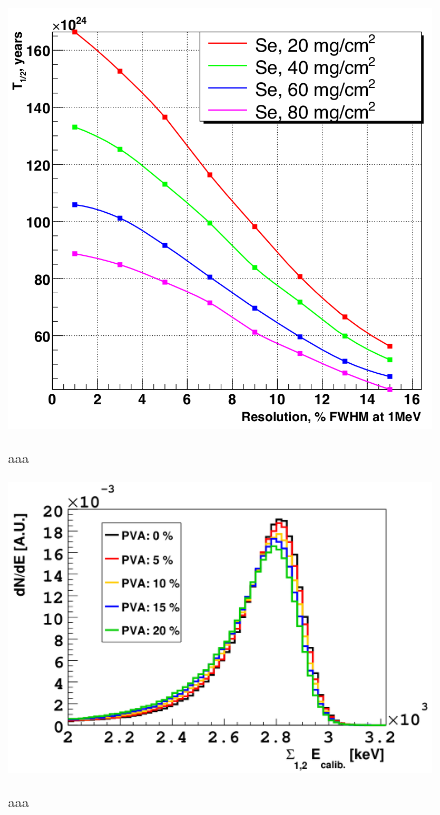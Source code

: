 \documentclass[main.tex]{subfiles}
\begin{document}
\begin{figure}[h!]
\centering
\includegraphics[scale=0.3]{pictures/Chap4/SensVsResolution.png}
\label{SensVsResolution.png}
\caption{aaa}
\end{figure}


\begin{figure}[h!]
\centering
\includegraphics[scale=0.3]{pictures/Chap4/SpectrumPVA.png}
\label{SpectrumPVA.png}
\caption{aaa}
\end{figure}
\end{document}
